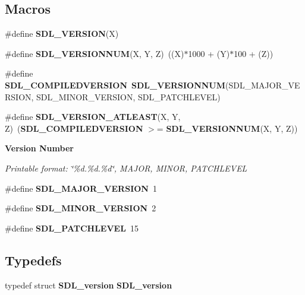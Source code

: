 \subsection*{Macros}
\begin{DoxyCompactItemize}
\item 
\#define {\bf S\+D\+L\+\_\+\+V\+E\+R\+S\+I\+O\+N}(X)
\item 
\#define {\bf S\+D\+L\+\_\+\+V\+E\+R\+S\+I\+O\+N\+N\+U\+M}(X,  Y,  Z)~((X)$\ast$1000 + (Y)$\ast$100 + (Z))
\item 
\#define {\bf S\+D\+L\+\_\+\+C\+O\+M\+P\+I\+L\+E\+D\+V\+E\+R\+S\+I\+O\+N}~{\bf S\+D\+L\+\_\+\+V\+E\+R\+S\+I\+O\+N\+N\+U\+M}(S\+D\+L\+\_\+\+M\+A\+J\+O\+R\+\_\+\+V\+E\+R\+S\+I\+O\+N, S\+D\+L\+\_\+\+M\+I\+N\+O\+R\+\_\+\+V\+E\+R\+S\+I\+O\+N, S\+D\+L\+\_\+\+P\+A\+T\+C\+H\+L\+E\+V\+E\+L)
\item 
\#define {\bf S\+D\+L\+\_\+\+V\+E\+R\+S\+I\+O\+N\+\_\+\+A\+T\+L\+E\+A\+S\+T}(X,  Y,  Z)~({\bf S\+D\+L\+\_\+\+C\+O\+M\+P\+I\+L\+E\+D\+V\+E\+R\+S\+I\+O\+N} $>$= {\bf S\+D\+L\+\_\+\+V\+E\+R\+S\+I\+O\+N\+N\+U\+M}(X, Y, Z))
\end{DoxyCompactItemize}
\begin{Indent}{\bf Version Number}\par
{\em Printable format\+: \char`\"{}\%d.\%d.\%d\char`\"{}, M\+A\+J\+O\+R, M\+I\+N\+O\+R, P\+A\+T\+C\+H\+L\+E\+V\+E\+L }\begin{DoxyCompactItemize}
\item 
\#define {\bfseries S\+D\+L\+\_\+\+M\+A\+J\+O\+R\+\_\+\+V\+E\+R\+S\+I\+O\+N}~1\label{_s_d_l__version_8h_a8fc808626be61507ade364b399f81468}

\item 
\#define {\bfseries S\+D\+L\+\_\+\+M\+I\+N\+O\+R\+\_\+\+V\+E\+R\+S\+I\+O\+N}~2\label{_s_d_l__version_8h_a2dd98e1cec119d54322cd9c8ea685c5c}

\item 
\#define {\bfseries S\+D\+L\+\_\+\+P\+A\+T\+C\+H\+L\+E\+V\+E\+L}~15\label{_s_d_l__version_8h_a84a0602cb43e6d9cefbdc119336019d5}

\end{DoxyCompactItemize}
\end{Indent}
\subsection*{Typedefs}
\begin{DoxyCompactItemize}
\item 
typedef struct {\bf S\+D\+L\+\_\+version} {\bfseries S\+D\+L\+\_\+version}\label{_s_d_l__version_8h_af87533c317dee86f75b51edd69541010}

\end{DoxyCompactItemize}

